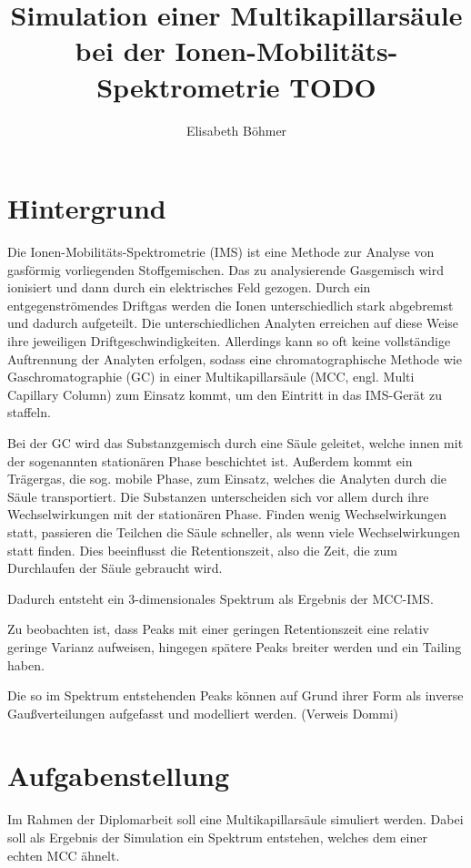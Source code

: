 \documentclass[a4paper,11pt]{article}
\title{Simulation einer Multikapillarsäule bei der Ionen-Mobilitäts-Spektrometrie TODO}
\author{Elisabeth Böhmer}
\begin{document}
\maketitle

\section{Hintergrund}
Die Ionen-Mobilitäts-Spektrometrie (IMS) ist eine Methode zur Analyse von gasförmig vorliegenden Stoffgemischen. 
Das zu analysierende Gasgemisch wird ionisiert und dann durch ein elektrisches Feld gezogen. Durch ein entgegenströmendes Driftgas werden die Ionen unterschiedlich stark abgebremst und dadurch aufgeteilt. Die unterschiedlichen Analyten erreichen auf diese Weise ihre jeweiligen Driftgeschwindigkeiten. 
Allerdings kann so oft keine vollständige Auftrennung der Analyten erfolgen, sodass eine chromatographische Methode wie Gaschromatographie (GC) in einer Multikapillarsäule (MCC, engl. Multi Capillary Column) zum Einsatz kommt, um den Eintritt in das IMS-Gerät zu staffeln.

Bei der GC wird das Substanzgemisch durch eine Säule geleitet, welche innen mit der sogenannten stationären Phase beschichtet ist. Außerdem kommt ein Trägergas, die sog. mobile Phase, zum Einsatz, welches die Analyten durch die Säule transportiert. Die Substanzen unterscheiden sich vor allem durch ihre Wechselwirkungen mit der stationären Phase. Finden wenig Wechselwirkungen statt, passieren die Teilchen die Säule schneller, als wenn viele Wechselwirkungen statt finden. Dies beeinflusst die Retentionszeit, also die Zeit, die zum Durchlaufen der Säule gebraucht wird. 

Dadurch entsteht ein 3-dimensionales Spektrum als Ergebnis der MCC-IMS. 

Zu beobachten ist, dass Peaks mit einer geringen Retentionszeit eine relativ geringe Varianz aufweisen, hingegen spätere Peaks breiter werden und ein Tailing haben. 

Die so im Spektrum entstehenden Peaks können auf Grund ihrer Form als inverse Gaußverteilungen aufgefasst und modelliert werden. (Verweis Dommi)

\section{Aufgabenstellung}
Im Rahmen der Diplomarbeit soll eine Multikapillarsäule simuliert werden. Dabei soll als Ergebnis der Simulation ein Spektrum entstehen, welches dem einer echten MCC ähnelt. 
\end{document}
